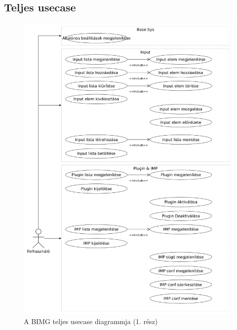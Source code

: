 \documentclass[a4paper,12pt,oneside]{report}
\begin{document}
\subsection{Teljes usecase}
\begin{figure}[h]
  \includegraphics[width=\textwidth]{usecase_part_1.png}
  \caption{A BIMG teljes usecase diagrammja (1. rész) }
  \label{fig:bimg_usecase_schema_part_1}
\end{figure}
\end{document}
